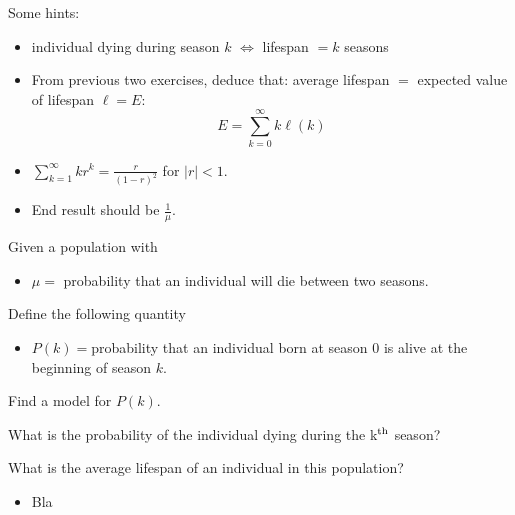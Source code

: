 \begin{annotation}
\begin{goals}
	Some hints:
	\begin{itemize}
		\item individual dying during season $k$ $\Leftrightarrow$ lifespan $= k$ seasons
		\item From previous two exercises, deduce that: average lifespan $=$ expected value of lifespan $\ell = E$:
		$$ E = \sum_{k=0}^\infty k \ell(k) $$
		\item $\displaystyle \sum_{k=1}^\infty k r^k = \frac{r}{(1-r)^2}$ for $|r|<1$.
		\item End result should be $\frac1\mu$.
\end{itemize}	
\end{goals}
\end{annotation}
\question
	Given a population with
	\begin{itemize}
		\item $\mu=$ probability that an individual will die between two seasons.
	\end{itemize}
\begin{parts}
	\item Define the following quantity
	\begin{itemize}
		\item $P(k)=$probability that an individual born at season $0$ is alive at the beginning of season $k$.
	\end{itemize}
	Find a model for $P(k)$.

	\item What is the probability of the individual dying during the k$^{\rm th}$ season?
	\item What is the average lifespan of an individual in this population?
\end{parts}




\bookonlynewpage




\begin{lesson}

	\begin{itemize}
		\item Bla
	\end{itemize}
	

\end{lesson}



